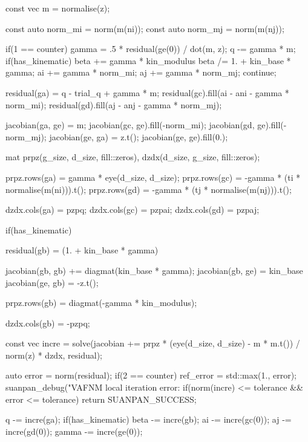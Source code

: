 \begin{cppcode}
{{        const vec m = normalise(z);

        const auto norm_mi = norm(m(ni));
        const auto norm_mj = norm(m(nj));

        if(1 == counter) {
            gamma = .5 * residual(ge(0)) / dot(m, z);
            q -= gamma * m;
            if(has_kinematic) {
                beta += gamma * kin_modulus %
                beta /= 1. + kin_base * gamma;
            }
            ai += gamma * norm_mi;
            aj += gamma * norm_mj;
            continue;
        }

        residual(ga) = q - trial_q + gamma * m;
        residual(gc).fill(ai - ani - gamma * norm_mi);
        residual(gd).fill(aj - anj - gamma * norm_mj);

        jacobian(ga, ge) = m;
        jacobian(gc, ge).fill(-norm_mi);
        jacobian(gd, ge).fill(-norm_mj);
        jacobian(ge, ga) = z.t();
        jacobian(ge, ge).fill(0.);

        mat prpz(g_size, d_size, fill::zeros), dzdx(d_size, g_size, fill::zeros);

        prpz.rows(ga) = gamma * eye(d_size, d_size);
        prpz.rows(gc) = -gamma * (ti * normalise(m(ni))).t();
        prpz.rows(gd) = -gamma * (tj * normalise(m(nj))).t();

        dzdx.cols(ga) = pzpq;
        dzdx.cols(gc) = pzpai;
        dzdx.cols(gd) = pzpaj;

        if(has_kinematic) {
            residual(gb) = (1. + kin_base * gamma) %

            jacobian(gb, gb) += diagmat(kin_base * gamma);
            jacobian(gb, ge) = kin_base %
            jacobian(ge, gb) = -z.t();

            prpz.rows(gb) = diagmat(-gamma * kin_modulus);

            dzdx.cols(gb) = -pzpq;
        }

        const vec incre = solve(jacobian += prpz * (eye(d_size, d_size) - m * m.t()) / norm(z) * dzdx, residual);

        auto error = norm(residual);
        if(2 == counter) ref_error = std::max(1., error);
        suanpan_debug("VAFNM local iteration error: %
        if(norm(incre) <= tolerance && error <= tolerance) return SUANPAN_SUCCESS;

        q -= incre(ga);
        if(has_kinematic) beta -= incre(gb);
        ai -= incre(gc(0));
        aj -= incre(gd(0));
        gamma -= incre(ge(0));
    }
}
\end{cppcode}